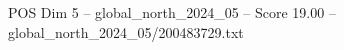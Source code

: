 \begin{textsample}{POS Dim 5 – global\_north\_2024\_05 – Score 19.00 – global\_north\_2024\_05/200483729.txt}
\end{textsample}
